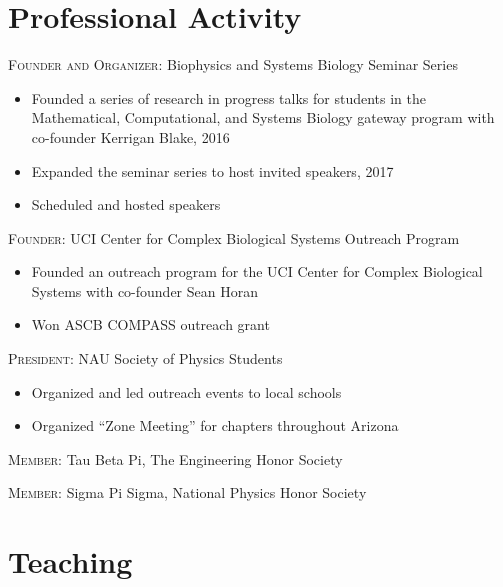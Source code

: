 \documentclass[letterpaper,10pt]{article} %
\begin{document}

\section*{Professional Activity}

\textsc{Founder and Organizer:} Biophysics and Systems Biology Seminar Series
\begin{itemize}
\item Founded a series of research in progress talks for students in the Mathematical, Computational, and Systems Biology gateway program with co-founder Kerrigan Blake, 2016
\item Expanded the seminar series to host invited speakers, 2017
\item Scheduled and hosted speakers
\end{itemize}

\textsc{Founder:} UCI Center for Complex Biological Systems Outreach Program
\begin{itemize}
\item Founded an outreach program for the UCI Center for Complex Biological Systems with co-founder Sean Horan
\item Won ASCB COMPASS outreach grant
\end{itemize}

\textsc{President:} NAU Society of Physics Students
\begin{itemize}
\item Organized and led outreach events to local schools
\item Organized ``Zone Meeting'' for chapters throughout Arizona
\end{itemize}

\textsc{Member:} Tau Beta Pi, The Engineering Honor Society

\textsc{Member:} Sigma Pi Sigma, National Physics Honor Society


\section*{Teaching}
\end{document}
